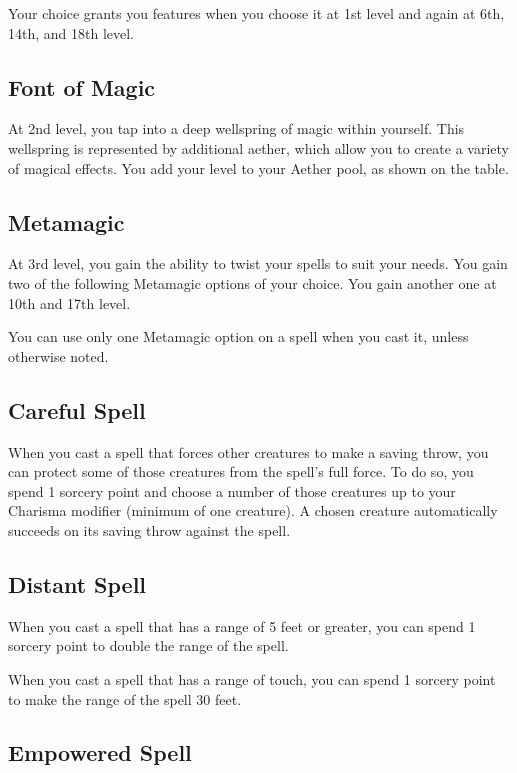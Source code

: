 Your choice grants you features when you choose it at 1st level and again at 6th, 14th, and 18th level.

\subsection{Font of Magic}

At 2nd level, you tap into a deep wellspring of magic within yourself. This wellspring is represented by additional aether, which allow you to create a variety of magical effects. You add your level to your Aether pool, as shown on the  table.

\subsection{Metamagic}

At 3rd level, you gain the ability to twist your spells to suit your needs. You gain two of the following Metamagic options of your choice. You gain another one at 10th and 17th level.

You can use only one Metamagic option on a spell when you cast it, unless otherwise noted.

\subsection{Careful Spell}

When you cast a spell that forces other creatures to make a saving throw, you can protect some of those creatures from the spell’s full force. To do so, you spend 1 sorcery point and choose a number of those creatures up to your Charisma modifier (minimum of one creature). A chosen creature automatically succeeds on its saving throw against the spell.

\subsection{Distant Spell}

When you cast a spell that has a range of 5 feet or greater, you can spend 1 sorcery point to double the range of the spell.

When you cast a spell that has a range of touch, you can spend 1 sorcery point to make the range of the spell 30 feet.

\subsection{Empowered Spell}

